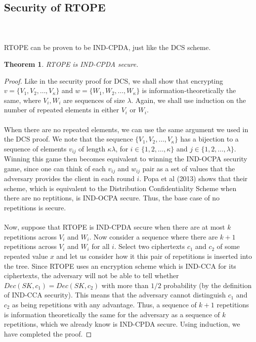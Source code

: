 \documentclass[12pt]{article}
\newtheorem{theorem}{Theorem}[section]
\begin{document}
  \subsection{Security of RTOPE} \\ \\
  RTOPE can be proven to be IND-CPDA, just like the DCS scheme. 
  \begin{theorem}
    RTOPE is IND-CPDA secure.
  \end{theorem}
  \begin{proof}
    Like in the security proof for DCS, we shall show that encrypting $v = \{V_1, V_2, \ldots, V_{\kappa} \}$ and $w = \{W_1, W_2, \ldots, W_{\kappa}\}$ is information-theoretically the same, where $V_i, W_i$ are sequences of size $\lambda$. Again, we shall use induction on the number of repeated elements in either $V_i$ or $W_i$. \\ \\
When there are no repeated elements, we can use the same argument we used in the DCS proof. We note that the sequence $\{V_1, V_2, \ldots, V_{\kappa} \}$ has a bijection to a sequence of elements $v_{ij}$ of length $\kappa \lambda$, for $i \in \{1, 2, \ldots, \kappa\}$ and $j \in \{1, 2, \ldots, \lambda \}$. Winning this game then becomes equivalent to winning the IND-OCPA security game, since one can think of each $v_{ij}$ and $w_{ij}$ pair as a set of values that the adversary provides the client in each round $i$. Popa et al (2013) shows that their scheme, which is equivalent to the Distribution Confidentiality Scheme when there are no reptitions, is IND-OCPA secure. Thus, the base case of no repetitions is secure. \\ \\
Now, suppose that RTOPE is IND-CPDA secure when there are at most $k$ repetitions across $V_i$ and $W_i$. Now consider a sequence where there are $k+1$ repetitions across $V_i$ and $W_i$ for all $i$. Select two ciphertexts $c_1$ and $c_2$ of some repeated value $x$ and let us consider how it this pair of repetitions is inserted into the tree. Since RTOPE uses an encryption scheme which is IND-CCA for its ciphertexts, the adversary will not be able to tell whether $Dec(SK, c_1) = Dec(SK, c_2)$ with more than $1/2$ probability (by the definition of IND-CCA security). This means that the adversary cannot distinguish $c_1$ and $c_2$ as being repetitions with any advantage. Thus, a sequence of $k+1$ repetitions is information theoretically the same for the adversary as a sequence of $k$ repetitions, which we already know is IND-CPDA secure. Using induction, we have completed the proof.  
  \end{proof}
\end{document}
